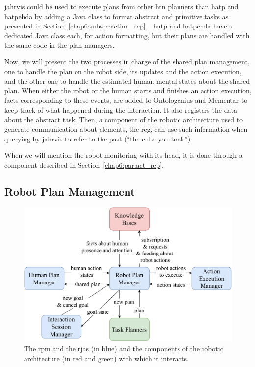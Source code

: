 \documentclass[a4paper,11pt,twoside]{StyleThese}
\begin{document}
\bigskip
\acrshort{jahrvis} could be used to execute plans from other \acrshort{htn} planners than \acrshort{hatp} and \acrshort{hatpehda} by adding a Java class to format abstract and primitive tasks as presented in Section~\ref{chap6:subsec:action_rep} -- \acrshort{hatp} and \acrshort{hatpehda} have a dedicated Java class each, for action formatting, but their plans are handled with the same code in the plan managers.

Now, we will present the two processes in charge of the shared plan management, one to handle the plan on the robot side, \ie its updates and the action execution, and the other one to handle the estimated human mental states about the shared plan. When either the robot or the human starts and finishes an action execution, facts corresponding to these events, are added to Ontologenius and Mementar to keep track of what happened during the interaction. It also registers the data about the abstract task. Then, a component of the robotic architecture used to generate communication about elements, the \acrfull{reg}, can use such information when querying by \acrshort{jahrvis} to refer to the past (\eg ``the cube you took'').

When we will mention the robot monitoring with its head, it is done through a component described in Section~\ref{chap6:par:act_rep}.



\subsection{Robot Plan Management}\label{chap6:subsec:robot_plan}

\begin{figure}[!hbt]
	\centering
	\includegraphics[width=0.85\linewidth]{figures/chapter2/robot_manager_zoom.pdf}
	\caption{The \acrlong{rpm} and the \acrshort{rja}s (in blue) and the components of the robotic architecture (in red and green) with which it interacts.}
	\label{chap6:fig:rob_manager_zoom}
\end{figure}
\end{document}
